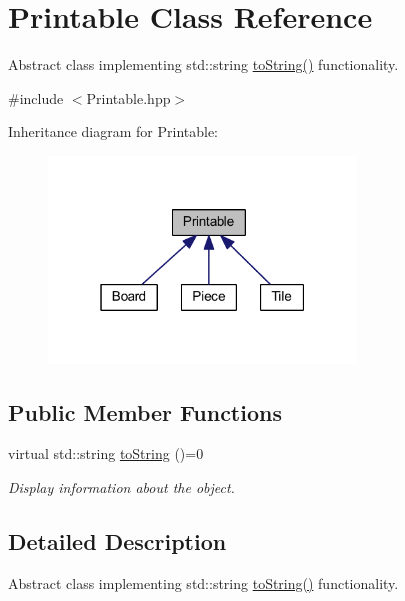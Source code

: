 \hypertarget{class_printable}{\section{Printable Class Reference}
\label{class_printable}
}


Abstract class implementing std\-::string \hyperlink{class_printable_a489f74384330f76d048d1ccf5c541571}{to\-String()} functionality.  




{\ttfamily \#include $<$Printable.\-hpp$>$}



Inheritance diagram for Printable\-:
\nopagebreak
\begin{figure}[H]
\begin{center}
\leavevmode
\includegraphics[width=232pt]{class_printable__inherit__graph}
\end{center}
\end{figure}
\subsection*{Public Member Functions}
\begin{DoxyCompactItemize}
\item 
\hypertarget{class_printable_a489f74384330f76d048d1ccf5c541571}{virtual std\-::string \hyperlink{class_printable_a489f74384330f76d048d1ccf5c541571}{to\-String} ()=0}\label{class_printable_a489f74384330f76d048d1ccf5c541571}

\begin{DoxyCompactList}\small\item\em Display information about the object. \end{DoxyCompactList}\end{DoxyCompactItemize}


\subsection{Detailed Description}
Abstract class implementing std\-::string \hyperlink{class_printable_a489f74384330f76d048d1ccf5c541571}{to\-String()} functionality. 

